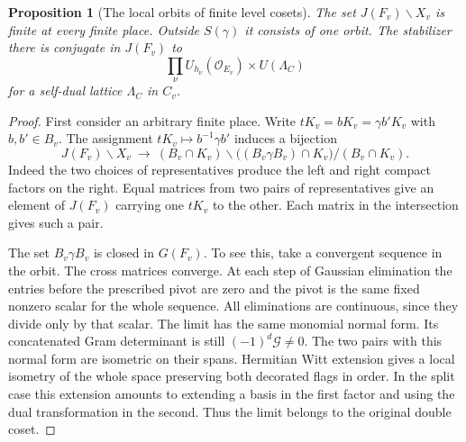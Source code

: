\documentclass[a4paper,11pt]{article}
\newtheorem{proposition}{Proposition}[section]
\theoremstyle{definition}
\theoremstyle{remark}
\numberwithin{equation}{section}
\begin{document}
\begin{proposition}[The local orbits of finite level cosets]
\label{prop:good205}
The set \(J(F_v)\backslash X_v\) is finite at every finite place.
Outside \(S(\gamma)\) it consists of one orbit. The stabilizer there
is conjugate in \(J(F_v)\) to
\[
       \prod_\nu U_{h_\nu}(\mathcal O_{E_v})\times U(\Lambda_C)
\]
for a self-dual lattice \(\Lambda_C\) in \(C_v\).
\end{proposition}
\begin{proof}
First consider an arbitrary finite place. Write \(tK_v=bK_v
=\gamma b'K_v\) with \(b,b'\in B_v\). The assignment
\(tK_v\mapsto b^{-1}\gamma b'\) induces a bijection
\[
 J(F_v)\backslash X_v \ \longrightarrow\
  (B_v\cap K_v)\backslash\bigl((B_v\gamma B_v)\cap K_v\bigr)
                                      /(B_v\cap K_v).
\]
Indeed the two choices of representatives produce the left and right
compact factors on the right. Equal matrices from two pairs of
representatives give an element of \(J(F_v)\) carrying one \(tK_v\)
to the other. Each matrix in the intersection gives such a pair.

The set \(B_v\gamma B_v\) is closed in \(G(F_v)\). To see this,
take a convergent sequence in the orbit. The cross matrices converge.
At each step of Gaussian elimination the entries before the prescribed
pivot are zero and the pivot is the same fixed nonzero scalar for the
whole sequence. All eliminations are continuous, since they divide
only by that scalar. The limit has the same monomial normal form.
Its concatenated Gram determinant is still \((-1)^d\mathcal G\ne0\).
The two pairs with this normal form are isometric on their spans.
Hermitian Witt extension gives a local isometry of the whole space
preserving both decorated flags in order. In the split case this
extension amounts to extending a basis in the first factor and using
the dual transformation in the second. Thus the limit belongs to
the original double coset.


\end{proof}
\end{document}
